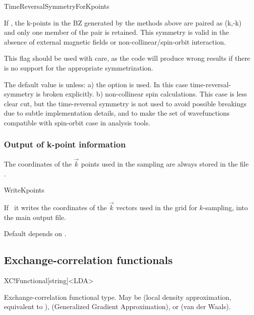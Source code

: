\begin{fdflogicalT}{TimeReversalSymmetryForKpoints}

If \fdftrue, the k-points in the BZ generated by the methods above
are paired as (k,-k) and only one member of the pair is retained. This
symmetry is valid in the absence of external magnetic fields or
non-collinear/spin-orbit interaction.

This flag should be used with care, as the code will produce wrong
results if there is no support for the appropriate symmetrization.

The default value is \fdftrue unless: a) the option  
is used. In this case time-reversal-symmetry is broken explicitly. b)
non-collinear spin calculations. This case is less clear cut, but the
time-reversal symmetry is not used to avoid possible breakings due to
subtle implementation details, and to make the set of wavefunctions
compatible with spin-orbit case in analysis tools.



\end{fdflogicalT}


\subsubsection{Output of k-point information}

The coordinates of the $\vec k$ points used in the sampling
are always stored in the file .

\begin{fdflogicalF}{WriteKpoints}
  
  If \fdftrue\ it writes the coordinates of the $\vec k$ vectors used
  in the grid for $k$-sampling, into the main output file.
  
  Default depends on .

\end{fdflogicalF}



\subsection{Exchange-correlation functionals}


\begin{fdfentry}{XC!Functional}[string]<LDA>
  
  Exchange-correlation functional type. May be  (local
  density approximation, equivalent to ), 
  (Generalized Gradient Approximation), or  (van der
  Waals).

\end{fdfentry}

